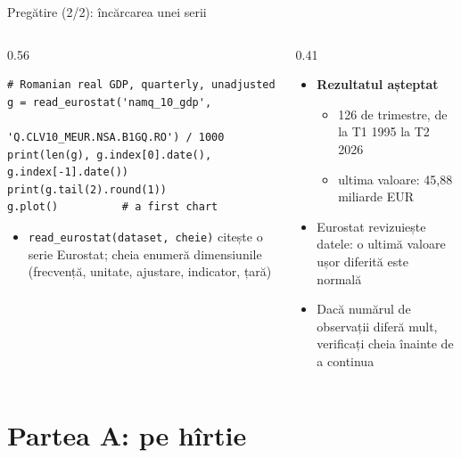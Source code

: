 \begin{frame}[fragile]{Pregătire (2/2): încărcarea unei serii}
\itemsize{\footnotesize}
\begin{columns}[T]
\begin{column}{0.56\textwidth}
\begin{lstlisting}
# Romanian real GDP, quarterly, unadjusted
g = read_eurostat('namq_10_gdp',
                  'Q.CLV10_MEUR.NSA.B1GQ.RO') / 1000
print(len(g), g.index[0].date(), g.index[-1].date())
print(g.tail(2).round(1))
g.plot()          # a first chart
\end{lstlisting}
\begin{itemize}
    \item \texttt{read\_eurostat(dataset, cheie)} citește o serie Eurostat; cheia enumeră dimensiunile (frecvență, unitate, ajustare, indicator, țară)
\end{itemize}
\end{column}
\begin{column}{0.41\textwidth}
\begin{itemize}
    \item \textbf{Rezultatul așteptat}
    \begin{itemize}
        \item 126 de trimestre, de la T1 1995 la T2 2026
        \item ultima valoare: 45{,}88 miliarde EUR
    \end{itemize}
    \item Eurostat revizuiește datele: o ultimă valoare ușor diferită este normală
    \item Dacă numărul de observații diferă mult, verificați cheia înainte de a continua
\end{itemize}
\end{column}
\end{columns}
\end{frame}


\section{Partea A: pe hîrtie}

